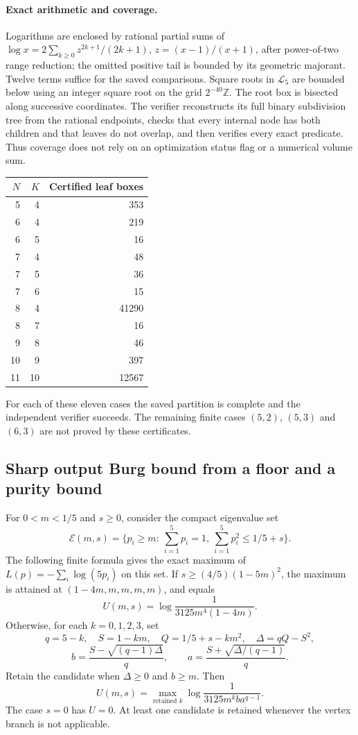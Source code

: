 \documentclass[11pt,a4paper]{article}
\begin{document}
\paragraph{Exact arithmetic and coverage.}
Logarithms are enclosed by rational partial sums of
$\log x=2\sum_{k\ge0}z^{2k+1}/(2k+1)$, $z=(x-1)/(x+1)$,
after power-of-two range reduction; the omitted positive tail is bounded
by its geometric majorant. Twelve terms suffice for the saved comparisons.
Square roots in $\mathcal L_5$ are bounded below using an integer square
root on the grid $2^{-40}\mathbb Z$.
The root box is bisected along successive coordinates. The verifier
reconstructs its full binary subdivision tree from the rational endpoints,
checks that every internal node has both children and that leaves do not
overlap, and then verifies every exact predicate. Thus coverage does not
rely on an optimization status flag or a numerical volume sum.

\begin{center}
\begin{tabular}{rrr}
$N$&$K$&Certified leaf boxes\\\hline
5&4&353\\
6&4&219\\
6&5&16\\
7&4&48\\
7&5&36\\
7&6&15\\
8&4&41290\\
8&7&16\\
9&8&46\\
10&9&397\\
11&10&12567
\end{tabular}
\end{center}
For each of these eleven cases the saved partition is complete and the
independent verifier succeeds. The remaining finite cases $(5,2)$,
$(5,3)$ and $(6,3)$ are not proved by these certificates.

\subsection{Sharp output Burg bound from a floor and a purity bound}
For $0<m<1/5$ and $s\ge0$, consider the compact eigenvalue set
\[
 \mathcal E(m,s)=\{p_i\ge m:\ \sum_{i=1}^5p_i=1,
                         \ \sum_{i=1}^5p_i^2\le1/5+s\}.
\]
The following finite formula gives the exact maximum of
$L(p)=-\sum_i\log(5p_i)$ on this set.
If $s\ge(4/5)(1-5m)^2$, the maximum is attained at
$(1-4m,m,m,m,m)$, and equals
\[
 U(m,s)=\log\frac1{3125m^4(1-4m)}.
\]
Otherwise, for each $k=0,1,2,3$, set
\[
 q=5-k,\quad S=1-km,\quad Q=1/5+s-km^2,\quad
 \Delta=qQ-S^2,
\]
\[
 b=\frac{S-\sqrt{(q-1)\Delta}}q,\qquad
 a=\frac{S+\sqrt{\Delta/(q-1)}}q.
\]
Retain the candidate when $\Delta\ge0$ and $b\ge m$.
Then
\[
 \boxed{\quad U(m,s)=
 \max_{\text{retained }k}\log\frac1{3125m^kba^{q-1}}.\quad}
\]
The case $s=0$ has $U=0$. At least one candidate is retained whenever
the vertex branch is not applicable.
\end{document}
